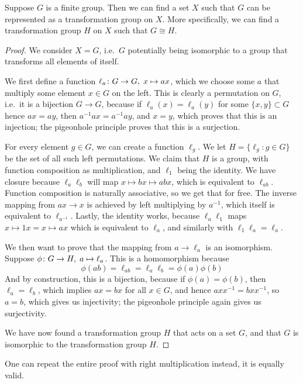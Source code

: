 \begin{theorem}\label{thm:cayley}
    Suppose \(G\) is a finite group.
    Then we can find a set \(X\)
    such that \(G\) can be represented
    as a transformation group on \(X\).
    More specifically,
    we can find a transformation group \(H\) on \(X\)
    such that \(G \cong H\).
\end{theorem}
\begin{proof}
    We consider \(X = G\),
    i.e.\ \(G\) potentially being isomorphic
    to a group that transforms all elements of itself.

    We first define a function \(\ell_a\colon G\to G,\;x\mapsto ax\),
    which we choose some \(a\)
    that multiply some element \(x \in G\) on the left.
    This is clearly a permutation on \(G\),
    i.e.\ it is a bijection \(G \to G\),
    because if \(\ell_a(x) = \ell_a(y)\) for some \(\{x,y\} \subset G\)
    hence \(ax = ay\), then \(a^{-1}ax = a^{-1}ay\), and \(x = y\),
    which proves that this is an injection;
    the pigeonhole principle proves that this is a surjection.

    For every element \(g \in G\),
    we can create a function \(\ell_g\).
    We let \(H = \{\ell_g : g \in G\}\)
    be the set of all such left permutations.
    We claim that \(H\) is a group,
    with function composition as multiplication,
    and \(\ell_1\) being the identity.
    We have closure because \(\ell_a\ell_b\)
    will map \(x \mapsto bx \mapsto abx\),
    which is equivalent to \(\ell_{ab}\).
    Function composition is naturally associative,
    so we get that for free.
    The inverse mapping from \(ax \to x\)
    is achieved by left multiplying by \(a^{-1}\),
    which itself is equivalent to \(\ell_{a^{-1}}\).
    Lastly, the identity works,
    because \(\ell_a\ell_1\) maps \(x \mapsto 1x = x \mapsto ax\)
    which is equivalent to \(\ell_a\),
    and similarly with \(\ell_1\ell_a = \ell_a\).

    We then want to prove that
    the mapping from \(a \to \ell_a\) is an isomorphism.
    Suppose \(\phi\colon G\to H,\;a\mapsto\ell_a\).
    This is a homomorphism because
    \begin{equation*}
        \phi(ab) = \ell_{ab} = \ell_a\ell_b = \phi(a)\phi(b)
    \end{equation*}
    And by construction, this is a bijection,
    because if \(\phi(a) = \phi(b)\),
    then \(\ell_a = \ell_b\),
    which implies \(ax = bx\) for all \(x \in G\),
    and hence \(axx^{-1} = bxx^{-1}\),
    so \(a = b\),
    which gives us injectivity;
    the pigeonhole principle again gives us surjectivity.

    We have now found a transformation group \(H\)
    that acts on a set \(G\),
    and that \(G\) is isomorphic to the transformation group \(H\).
\end{proof}
\begin{remark}
    One can repeat the entire proof with right multiplication instead,
    it is equally valid.
\end{remark}


